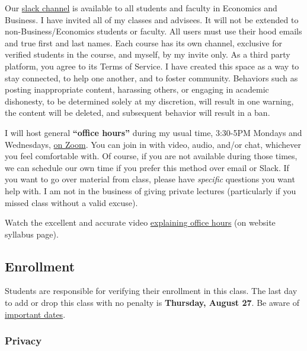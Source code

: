 \documentclass{article}
\begin{document}
Our \href{https://hoodcollegeeconomics.slack.com}{slack channel} is
available to all students and faculty in Economics and Business. I have
invited all of my classes and advisees. It will not be extended to
non-Business/Economics students or faculty. All users must use their
hood emails and true first and last names. Each course has its own
channel, exclusive for verified students in the course, and myself, by
my invite only. As a third party platform, you agree to its Terms of
Service. I have created this space as a way to stay connected, to help
one another, and to foster community. Behaviors such as posting
inappropriate content, harassing others, or engaging in academic
dishonesty, to be determined solely at my discretion, will result in one
warning, the content will be deleted, and subsequent behavior will
result in a ban.

I will host general \textbf{``office hours''} during my usual time,
3:30-5PM Mondays and Wednesdays, \href{https://zoom.us/j/458617463}{on
Zoom}. You can join in with video, audio, and/or chat, whichever you
feel comfortable with. Of course, if you are not available during those
times, we can schedule our own time if you prefer this method over email
or Slack. If you want to go over material from class, please have
\emph{specific} questions you want help with. I am not in the business
of giving private lectures (particularly if you missed class without a
valid excuse).

Watch the excellent and accurate video
\href{https://vimeo.com/270014784}{explaining office hours} (on website
syllabus page).

\hypertarget{enrollment}{%
\subsection*{Enrollment}\label{enrollment}}

Students are responsible for verifying their enrollment in this class.
The last day to add or drop this class with no penalty is
\textbf{Thursday, August 27}. Be aware of
\href{https://www.hood.edu/offices-services/registrars-office/academic-calendar}{important
dates}.

\hypertarget{privacy}{%
\subsubsection*{Privacy}\label{privacy}}
\end{document}
